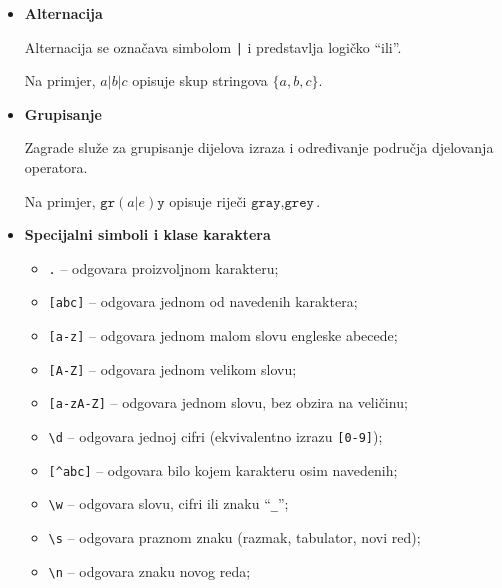 \begin{itemize}
	
	\item \textbf{Alternacija}
	
	Alternacija se označava simbolom \texttt{|} i predstavlja logičko ``ili''.
	
	Na primjer, 	$a|b|c $ opisuje skup stringova  $
	\{a,b,c\}.$
	
	\item \textbf{Grupisanje}
	
	Zagrade služe za grupisanje dijelova izraza i određivanje područja djelovanja operatora.
	
	Na primjer, $\texttt{gr}(a|e)\texttt{y}$ opisuje riječi $
	{\texttt{gray},\texttt{grey}}.
	$
	
	\item \textbf{Specijalni simboli i klase karaktera}
	
	\begin{itemize}
		
		\item \texttt{.} -- odgovara proizvoljnom karakteru;
		
		\item \texttt{[abc]} -- odgovara jednom od navedenih karaktera;
		
		\item \texttt{[a-z]} -- odgovara jednom malom slovu engleske abecede;
		
		\item \texttt{[A-Z]} -- odgovara jednom velikom slovu;
		
		\item \texttt{[a-zA-Z]} -- odgovara jednom slovu, bez obzira na veličinu;
		
		\item \texttt{\textbackslash d} -- odgovara jednoj cifri (ekvivalentno izrazu \texttt{[0-9]});
		
		\item \texttt{[\^{}abc]} -- odgovara bilo kojem karakteru osim navedenih;
		
		\item \texttt{\textbackslash w} -- odgovara slovu, cifri ili znaku ``\texttt{\_}'';
		
		\item \texttt{\textbackslash s} -- odgovara praznom znaku (razmak, tabulator, novi red);
		
		\item \texttt{\textbackslash n} -- odgovara znaku novog reda;
		

\end{itemize}
\end{itemize}
